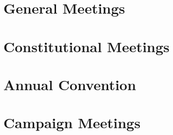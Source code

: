 \section{General Meetings}
\section{Constitutional Meetings}
\section{Annual Convention}
\section{Campaign Meetings}
